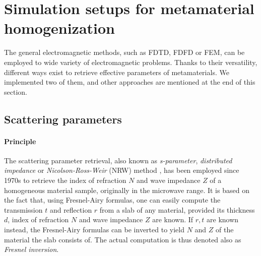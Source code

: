 
\section{Simulation setups for metamaterial homogenization} %

The general electromagnetic methods, such as FDTD, FDFD or FEM, can be employed to wide variety of electromagnetic problems. Thanks to their versatility, different ways exist to retrieve effective parameters of metamaterials. We implemented two of them, and other approaches are mentioned at the end of this section.
\subsection{Scattering parameters}
\paragraph{Principle} %
The scattering parameter retrieval, also known as \textit{s-parameter}, \textit{distributed impedance} or \textit{Nicolson-Ross-Weir} (NRW) method \cite{nicolson1970measurement, weir1974automatic}, has been employed since 1970s to retrieve the index of refraction $N$ and wave impedance $Z$ of a homogeneous material sample, originally in the microwave range. It is based on the fact that, using Fresnel-Airy formulas, %
one can easily compute the transmission $t$ and reflection $r$ from a slab of any material, provided its thickness $d$, index of refraction $N$ and wave impedance $Z$ are known.  If $r,t$ are known instead, the Fresnel-Airy formulas can be inverted to yield $N$ and $Z$ of the material the slab consists of. The actual computation is thus denoted also as \textit{Fresnel inversion}.

